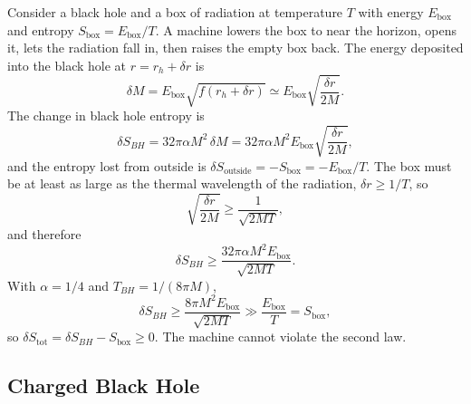 Consider a black hole and a box of radiation at temperature $T$ with
energy $E_{\text{box}}$ and entropy $S_{\text{box}} = E_{\text{box}}/T$.
A machine lowers the box to near the horizon, opens it, lets the
radiation fall in, then raises the empty box back. The energy deposited
into the black hole at $r = r_h + \delta r$ is
\begin{equation}
	\delta M = E_{\text{box}}\sqrt{f(r_h+\delta r)}
	\simeq E_{\text{box}}\sqrt{\frac{\delta r}{2M}}.
\end{equation}
The change in black hole entropy is
\begin{equation}
	\delta S_{BH} = 32\pi\alpha M^2\,\delta M
	= 32\pi\alpha M^2 E_{\text{box}}\sqrt{\frac{\delta r}{2M}},
\end{equation}
and the entropy lost from outside is $\delta S_{\text{outside}}
	= -S_{\text{box}} = -E_{\text{box}}/T$. The box must be at least as
large as the thermal wavelength of the radiation, $\delta r \geq 1/T$,
so
\begin{equation}
	\sqrt{\frac{\delta r}{2M}} \geq \frac{1}{\sqrt{2MT}},
\end{equation}
and therefore
\begin{equation}
	\delta S_{BH} \geq \frac{32\pi\alpha M^2 E_{\text{box}}}{\sqrt{2MT}}.
\end{equation}
With $\alpha = 1/4$ and $T_{BH} = 1/(8\pi M)$,
\begin{equation}
	\delta S_{BH} \geq \frac{8\pi M^2 E_{\text{box}}}{\sqrt{2MT}}
	\gg \frac{E_{\text{box}}}{T} = S_{\text{box}},
\end{equation}
so $\delta S_{\text{tot}} = \delta S_{BH} - S_{\text{box}} \geq 0$.
The machine cannot violate the second law.

\subsection*{Charged Black Hole}

